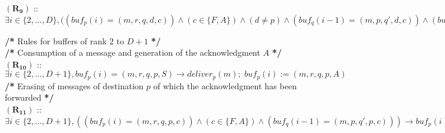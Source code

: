 \documentclass[11pt]{article}
\begin{document}
\begin{algorithm}
{\begin{description}
				$\boldsymbol{(R_{9})}$ :: $\exists i\in\{2,...,D\},((buf_{p}(i)=(m,r,q,d,c)) \wedge (c\in\{F,A\}) \wedge (d\neq p)
				\wedge (buf_{q}(i-1)=(m,p,q',d,c)) \wedge (buf_{r}(i+1)\neq(m,r',p,d,c)) \longrightarrow buf_{p}(i):=\varepsilon$
		\item \textbf{/*} Rules for buffers of rank $2$ to $D+1$ \textbf{*/}\\
			\textbf{/*} Consumption of a message and generation of the acknowledgment $A$ \textbf{*/}\\
			$\boldsymbol{(R_{10})}$ :: $\exists i\in\{2,...,D+1\},buf_{p}(i)=(m,r,q,p,S)\longrightarrow deliver_{p}(m);\;buf_{p}(i):=(m,r,q,p,A)$ \\
	\textbf{/*} Erasing of messages of destination $p$ of which the acknowledgment has been forwarded \textbf{*/}\\
			$\boldsymbol{(R_{11})}$ :: $\exists i\in\{2,...,D+1\},((buf_{p}(i)=(m,r,q,p,c)) \wedge (c\in\{F,A\}) \wedge (buf_{q}(i-1)=(m,p,q',p,c)))\longrightarrow buf_{p}(i):=\varepsilon$
			\end{description}
}
\end{algorithm}
\end{document}
